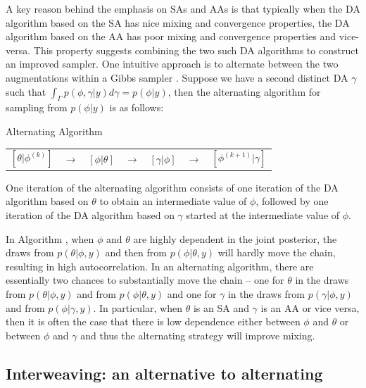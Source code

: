 \documentclass[12pt]{article}
\begin{document}
A key reason behind the emphasis on SAs and AAs is that typically when the DA algorithm based on the SA has nice mixing and convergence properties, the DA algorithm based on the AA has poor mixing and convergence properties and vice-versa. This property suggests combining the two such DA algorithms to construct an improved sampler. One intuitive approach is to alternate between the two augmentations within a Gibbs sampler \citep{papaspiliopoulos2007general}. Suppose we have a second distinct DA $\gamma$ such that $\int_\Gamma p(\phi,\gamma|y)d\gamma = p(\phi|y)$, then the alternating algorithm for sampling from $p(\phi|y)$ is as follows:
\begin{alg*}[Alt]Alternating Algorithm\label{alg:Alt}
  \begin{center}
    \begin{tabular}{lllllll}
  $[\theta|\phi^{(k)}]$& $\to$& $[\phi|\theta]$& $\to$& $[\gamma|\phi]$& $\to$& $[\phi^{(k+1)}|\gamma]$
    \end{tabular}
  \end{center}
\end{alg*}
\noindent One iteration of the alternating algorithm consists of one iteration of the DA algorithm based on $\theta$ to obtain an intermediate value of $\phi$, followed by one iteration of the DA algorithm based on $\gamma$ started at the intermediate value of $\phi$.

In Algorithm , when $\phi$ and $\theta$ are highly dependent in the joint posterior, the draws from $p(\theta|\phi,y)$ and then from $p(\phi|\theta,y)$ will hardly move the chain, resulting in high autocorrelation. In an alternating algorithm, there are essentially two chances to substantially move the chain -- one for $\theta$ in the draws from $p(\theta|\phi,y)$ and from $p(\phi|\theta,y)$ and one for $\gamma$ in the draws from $p(\gamma|\phi,y)$ and from $p(\phi|\gamma,y)$.  In particular, when $\theta$ is an SA and $\gamma$ is an AA or vice versa, then it is often the case that there is low dependence either between $\phi$ and $\theta$ or between $\phi$ and $\gamma$ and thus the alternating strategy will improve mixing.

\subsection{Interweaving: an alternative to alternating}\label{sec:Intro:int}
\end{document}

